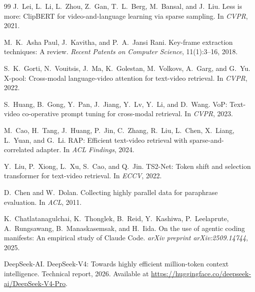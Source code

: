\documentclass[10pt,a4paper]{ctexart}
\begin{document}
\begin{thebibliography}{99}
J.~Lei, L.~Li, L.~Zhou, Z.~Gan, T.~L.~Berg, M.~Bansal, and J.~Liu.
\newblock Less is more: ClipBERT for video-and-language learning via sparse sampling.
\newblock In \textit{CVPR}, 2021.

M.~K.~Asha Paul, J.~Kavitha, and P.~A.~Jansi Rani.
\newblock Key-frame extraction techniques: A review.
\newblock \textit{Recent Patents on Computer Science}, 11(1):3--16, 2018.

S.~K.~Gorti, N.~Vouitsis, J.~Ma, K.~Golestan, M.~Volkovs, A.~Garg, and G.~Yu.
\newblock X-pool: Cross-modal language-video attention for text-video retrieval.
\newblock In \textit{CVPR}, 2022.

S.~Huang, B.~Gong, Y.~Pan, J.~Jiang, Y.~Lv, Y.~Li, and D.~Wang.
\newblock VoP: Text-video co-operative prompt tuning for cross-modal retrieval.
\newblock In \textit{CVPR}, 2023.

M.~Cao, H.~Tang, J.~Huang, P.~Jin, C.~Zhang, R.~Liu, L.~Chen, X.~Liang, L.~Yuan, and G.~Li.
\newblock RAP: Efficient text-video retrieval with sparse-and-correlated adapter.
\newblock In \textit{ACL Findings}, 2024.

Y.~Liu, P.~Xiong, L.~Xu, S.~Cao, and Q.~Jin.
\newblock TS2-Net: Token shift and selection transformer for text-video retrieval.
\newblock In \textit{ECCV}, 2022.

D.~Chen and W.~Dolan.
\newblock Collecting highly parallel data for paraphrase evaluation.
\newblock In \textit{ACL}, 2011.

K.~Chatlatanagulchai, K.~Thonglek, B.~Reid, Y.~Kashiwa, P.~Leelaprute, A.~Rungsawang, B.~Manaskasemsak, and H.~Iida.
\newblock On the use of agentic coding manifests: An empirical study of Claude Code.
\newblock \textit{arXiv preprint arXiv:2509.14744}, 2025.

DeepSeek-AI.
\newblock DeepSeek-V4: Towards highly efficient million-token context intelligence.
\newblock Technical report, 2026.
\newblock Available at \url{https://huggingface.co/deepseek-ai/DeepSeek-V4-Pro}.

\end{thebibliography}
\end{document}
